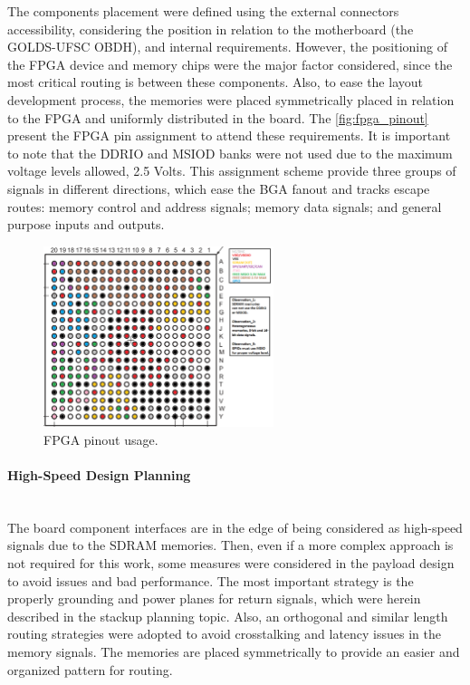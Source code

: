 The components placement were defined using the external connectors accessibility, considering the position in relation to the motherboard (the GOLDS-UFSC OBDH), and internal requirements. However, the positioning of the FPGA device and memory chips were the major factor considered, since the most critical routing is between these components. Also, to ease the layout development process, the memories were placed symmetrically placed in relation to the FPGA and uniformly distributed in the board. The \autoref{fig:fpga_pinout} present the FPGA pin assignment to attend these requirements. It is important to note that the DDRIO and MSIOD banks were not used due to the maximum voltage levels allowed, 2.5 Volts. This assignment scheme provide three groups of signals in different directions, which ease the BGA fanout and tracks escape routes: memory control and address signals; memory data signals; and general purpose inputs and outputs.

\begin{figure}[!ht]
    \begin{center}
        \includegraphics[width=0.6\textwidth]{figures/FPGA_pinout_prototype.png}
        \caption{FPGA pinout usage.}
        \label{fig:fpga_pinout}
    \end{center}
\end{figure}

\paragraph{High-Speed Design Planning} \mbox{}\\

The board component interfaces are in the edge of being considered as high-speed signals due to the SDRAM memories. Then, even if a more complex approach is not required for this work, some measures were considered in the payload design to avoid issues and bad performance. The most important strategy is the properly grounding and power planes for return signals, which were herein described in the stackup planning topic. Also, an orthogonal and similar length routing strategies were adopted to avoid crosstalking and latency issues in the memory signals. The memories are placed symmetrically to provide an easier and organized pattern for routing. 

